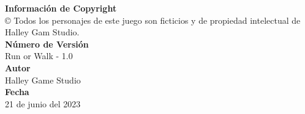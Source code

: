 \textbf {Información de Copyright} \\

© Todos los personajes de este juego son ficticios y de propiedad
intelectual de Halley Gam Studio.\\

\textbf {Número de Versión} \\

Run or Walk - 1.0\\

\textbf {Autor}\\

Halley Game Studio\\

\textbf {Fecha}\\

21 de junio del 2023\\
